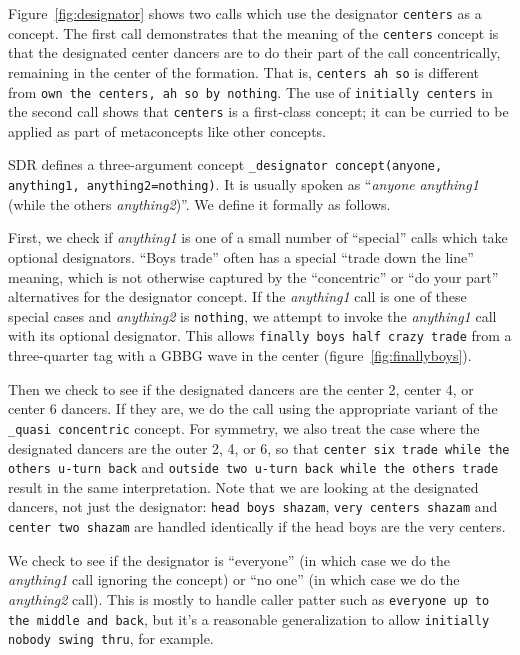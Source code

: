 \documentclass[12pt]{article}
\renewcommand{\call}[1]{\texttt{#1}} %
\begin{document}
Figure~\ref{fig:designator} shows two calls which use the designator
\call{centers} as a concept.  The first call demonstrates that the
meaning of the \call{centers} concept is that the designated center
dancers are to do their part of the call concentrically, remaining in
the center of the formation.  That is, \call{centers ah so} is
different from \call{own the centers, ah so by nothing}.  The use of
\call{initially centers} in the second call shows that \call{centers}
is a first-class concept; it can be curried to be applied as part of
metaconcepts like other concepts.

SDR defines a three-argument concept \call{\_designator concept(anyone,
  anything1, anything2=nothing)}.  It is usually spoken as
``\textit{anyone} \textit{anything1} (while the others \textit{anything2})''.
We define it formally as follows.

First, we check if \textit{anything1} is one of a small number of ``special''
calls which take optional designators.  ``Boys trade'' often has a
special ``trade down the line'' meaning, which is not otherwise
captured by the ``concentric'' or ``do your part'' alternatives for
the designator concept.  If the \textit{anything1} call is one of these
special cases and \textit{anything2} is \call{nothing}, we attempt to
invoke the \textit{anything1} call with its optional
designator.  This allows \call{finally boys half crazy trade} from a
three-quarter tag with a GBBG wave in the center (figure~\ref{fig:finallyboys}).

Then we check to see if the designated dancers are the center 2,
center 4, or center 6 dancers.  If they are, we do the call using the
appropriate variant of the \call{\_quasi concentric} concept.  For
symmetry, we also treat the case where the designated dancers are the
outer 2, 4, or 6, so that \call{center six trade while the
  others u-turn back} and \call{outside two u-turn back while the
  others trade} result in the same interpretation.  Note that we are
looking at the designated dancers, not just the designator: \call{head
  boys shazam}, \call{very centers shazam} and \call{center two
  shazam} are handled identically if the head boys are the very centers.

We check to see if the designator is ``everyone'' (in which case we do
the \textit{anything1} call ignoring the concept) or ``no one'' (in
which case we do the \textit{anything2} call).
This is mostly to handle caller patter such as \call{everyone
up to the middle and back}, but it's a reasonable generalization to
allow \call{initially nobody swing thru}, for example.
\end{document}
